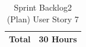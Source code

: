\documentclass[12pt]{report}
\begin{document}
\begin{table}[h]
{\begin{tabular}{|cc|cccccccc|}
\multicolumn{2}{|c|}{\textbf{Total}}                                                                                                                                                  & \multicolumn{8}{c|}{30   Hours}                                                                                                                                                                                                                                                                                                                                                                                                                                                                                                                                                                                                                                                                                                                                                                                                                                                                                            \\ \hline
\end{tabular}
}
\caption{Sprint Backlog2 (Plan) User Story 7}
\label{tab:mytable}
\end{table}
\end{document}
